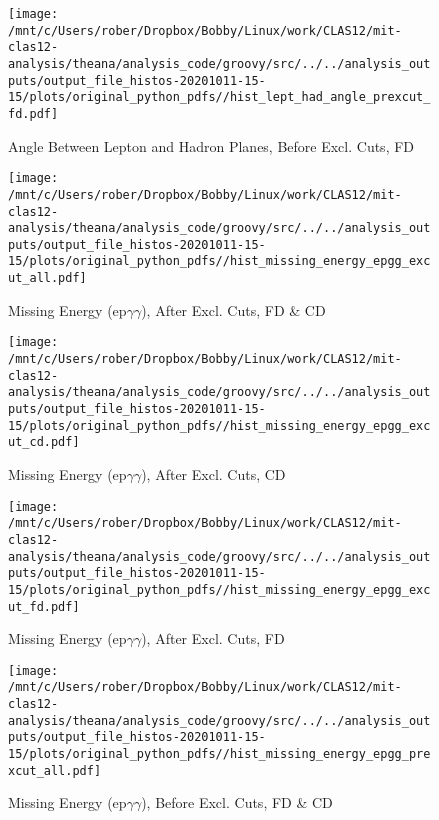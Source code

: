 \documentclass{article}
\begin{document}
\begin{landscape}
\begin{figure}[h]
        \texttt{[image: /mnt/c/Users/rober/Dropbox/Bobby/Linux/work/CLAS12/mit-clas12-analysis/theana/analysis\_code/groovy/src/../../analysis\_outputs/output\_file\_histos-20201011-15-15/plots/original\_python\_pdfs//hist\_lept\_had\_angle\_prexcut\_fd.pdf]}
        \captionsetup{textformat=empty,labelformat=blank}
        \caption{Angle Between Lepton and Hadron Planes, Before Excl. Cuts, FD}
    \end{figure}
    \clearpage
    
    \begin{figure}[h]
        \centering

        \texttt{[image: /mnt/c/Users/rober/Dropbox/Bobby/Linux/work/CLAS12/mit-clas12-analysis/theana/analysis\_code/groovy/src/../../analysis\_outputs/output\_file\_histos-20201011-15-15/plots/original\_python\_pdfs//hist\_missing\_energy\_epgg\_excut\_all.pdf]}
        \captionsetup{textformat=empty,labelformat=blank}
        \caption{Missing Energy (ep$\gamma$$\gamma$), After Excl. Cuts, FD \& CD}
    \end{figure}
    \clearpage
    
    \begin{figure}[h]
        \centering

        \texttt{[image: /mnt/c/Users/rober/Dropbox/Bobby/Linux/work/CLAS12/mit-clas12-analysis/theana/analysis\_code/groovy/src/../../analysis\_outputs/output\_file\_histos-20201011-15-15/plots/original\_python\_pdfs//hist\_missing\_energy\_epgg\_excut\_cd.pdf]}
        \captionsetup{textformat=empty,labelformat=blank}
        \caption{Missing Energy (ep$\gamma$$\gamma$), After Excl. Cuts, CD}
    \end{figure}
    \clearpage
    
    \begin{figure}[h]
        \centering

        \texttt{[image: /mnt/c/Users/rober/Dropbox/Bobby/Linux/work/CLAS12/mit-clas12-analysis/theana/analysis\_code/groovy/src/../../analysis\_outputs/output\_file\_histos-20201011-15-15/plots/original\_python\_pdfs//hist\_missing\_energy\_epgg\_excut\_fd.pdf]}
        \captionsetup{textformat=empty,labelformat=blank}
        \caption{Missing Energy (ep$\gamma$$\gamma$), After Excl. Cuts, FD}
    \end{figure}
    \clearpage
    
    \begin{figure}[h]
        \centering

        \texttt{[image: /mnt/c/Users/rober/Dropbox/Bobby/Linux/work/CLAS12/mit-clas12-analysis/theana/analysis\_code/groovy/src/../../analysis\_outputs/output\_file\_histos-20201011-15-15/plots/original\_python\_pdfs//hist\_missing\_energy\_epgg\_prexcut\_all.pdf]}
        \captionsetup{textformat=empty,labelformat=blank}
        \caption{Missing Energy (ep$\gamma$$\gamma$), Before Excl. Cuts, FD \& CD}
    \end{figure}
    \clearpage
    

\end{landscape}
\end{document}

